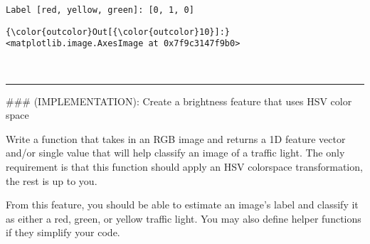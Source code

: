 \documentclass[11pt]{article}
\begin{document}
    \begin{Verbatim}[commandchars=\\\{\}]
Label [red, yellow, green]: [0, 1, 0]

    \end{Verbatim}

\begin{Verbatim}[commandchars=\\\{\}]
{\color{outcolor}Out[{\color{outcolor}10}]:} <matplotlib.image.AxesImage at 0x7f9c3147f9b0>
\end{Verbatim}
            
    \begin{center}
    \end{center}
    { \hspace*{\fill} \\}
    
    \begin{center}\rule{0.5\linewidth}{\linethickness}\end{center}

 \#\#\# (IMPLEMENTATION): Create a brightness feature that uses HSV
color space

Write a function that takes in an RGB image and returns a 1D feature
vector and/or single value that will help classify an image of a traffic
light. The only requirement is that this function should apply an HSV
colorspace transformation, the rest is up to you.

From this feature, you should be able to estimate an image's label and
classify it as either a red, green, or yellow traffic light. You may
also define helper functions if they simplify your code.
\end{document}
